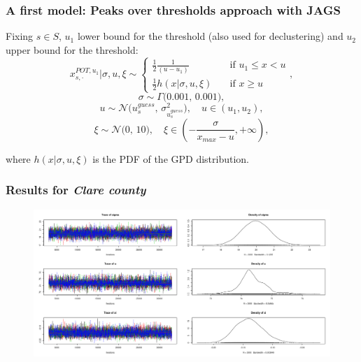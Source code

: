 \documentclass[usenames,dvipsnames]{beamer}
\begin{document}
\begin{frame}
\frametitle{A first model: \textbf{Peaks over thresholds approach} with JAGS}
\small
Fixing $s \in S$, $u_1$ lower bound for the threshold (also used for declustering) and $u_2$ upper bound for the threshold:
\begin{equation*}
    x_{s,\cdot}^{POT, u_1}|\sigma,u,\xi \sim \begin{cases}
    \frac{1}{2}\frac{1}{(u - u_1)}       & \quad \text{if } u_1 \leq x < u\\
    \frac{1}{2}h(x | \sigma, u, \xi)  & \quad \text{if } x \geq u
  \end{cases},
\end{equation*}   
\begin{equation*}
    \sigma \sim \Gamma\textit{(0.001, 0.001)},
\end{equation*}
\begin{equation*}
    u \sim \mathcal{N}\textit{($u^{guess}_s$, $\sigma^2_{u^{guess}_s}$)}, \quad u \in (u_1, u_2),
\end{equation*}
\begin{equation*}
    \xi \sim \mathcal{N}\textit{(0, 10)}, \quad \xi \in \left( -\dfrac{\sigma}{x_{max} - u}, + \infty \right),
\end{equation*}

\vspace{10pt} 
where $h(x|\sigma, u, \xi)$ is the PDF of the GPD distribution.

\end{frame}









\begin{frame}
\frametitle{Results for \textit{Clare county}}
\begin{figure}[h!]
    \centering
    \includegraphics[width=1\textwidth]{coda_plot_GPD.png}
\end{figure}
     
\end{frame}
\end{document}
